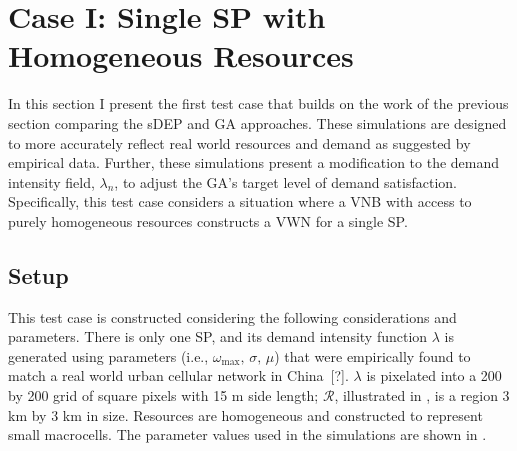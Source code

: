 \documentclass[12pt,dvipsnames]{report}
\begin{document}
\section{Case I: Single SP with Homogeneous Resources} \label{sec:caseI}

In this section I present the first test case that builds on the work of the previous section comparing the sDEP and GA approaches.  These simulations are designed to more accurately reflect real world resources and demand as suggested by empirical data.  Further, these simulations present a modification to the demand intensity field, $\lambda_n$, to adjust the GA's target level of demand satisfaction.  Specifically, this test case considers a situation where a VNB with access to purely homogeneous resources constructs a VWN for a single SP.

\subsection{Setup} \label{subsec:caseI_setup}

%
This test case is constructed considering the following considerations and parameters.  There is only one SP, and its demand intensity function $\lambda$ is generated using parameters (i.e., $\omega_{\max},\, \sigma,\, \mu$) that were empirically found to match a real world urban cellular network in China~[?].  $\lambda$ is pixelated into a 200 by 200 grid of square pixels with 15 m side length; $\mathcal{R}$, illustrated in , is a region 3 km by 3 km in size.  Resources are homogeneous and constructed to represent small macrocells.  The parameter values used in the simulations are shown in .
\end{document}
